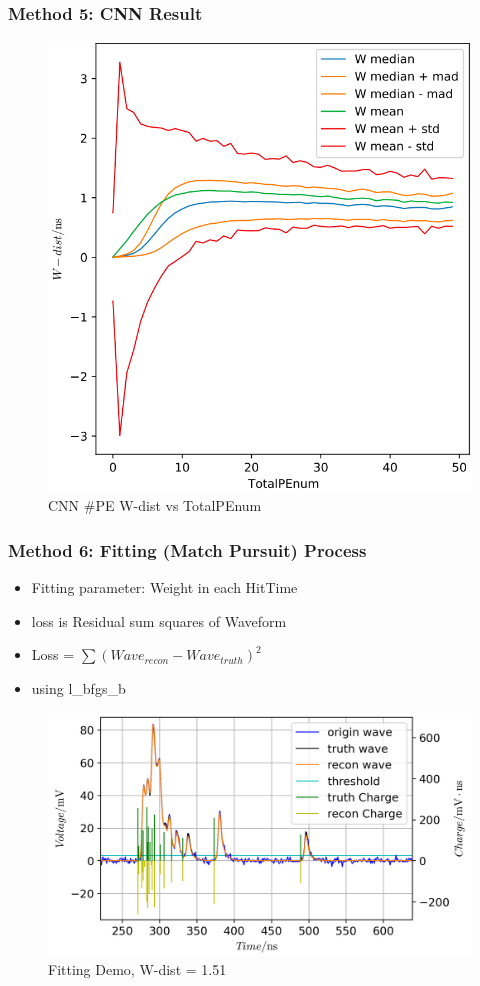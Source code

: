 \documentclass{beamer}
\begin{document}
\begin{frame}
\frametitle{Method 5: CNN Result}
\setlength{\abovecaptionskip}{0mm}
\setlength{\belowcaptionskip}{0mm}
\begin{figure}
    \centering
    \caption{CNN \#PE W-dist vs TotalPEnum}
    \includegraphics[width=0.65\linewidth]{img/takarapenumstats.png}
\end{figure}
\end{frame}

\begin{frame}
\frametitle{Method 6: Fitting (Match Pursuit) Process}
\begin{itemize}
    \item Fitting parameter: Weight in each HitTime
    \item loss is Residual sum squares of Waveform
    \item Loss = $\sum(Wave_{recon}-Wave_{truth})^{2}$
    \item using l\_bfgs\_b
\end{itemize}
\setlength{\abovecaptionskip}{0mm}
\setlength{\belowcaptionskip}{0mm}
\begin{figure}
    \centering
    \caption{Fitting Demo, W-dist = 1.51}
    \includegraphics[width=0.85\linewidth]{img/demo.png}
\end{figure}
\end{frame}
\end{document}
